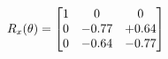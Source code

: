 \documentclass[preview]{standalone}
\begin{document}
\begin{align*}
\special{dvisvgm:raw <g id='unique000'>}R_{x}(\theta) = \begin{bmatrix}1 & 0 & 0 \\0 & -0.77 & +0.64 \\0 & -0.64 & -0.77\end{bmatrix}\special{dvisvgm:raw </g>}
\end{align*}
\end{document}
